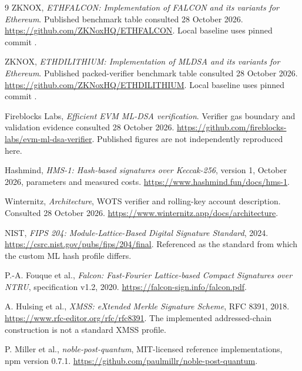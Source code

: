 \documentclass[11pt,a4paper]{article}
\begin{document}
\newpage
\renewcommand{\refname}{References and evidence sources}
\begin{thebibliography}{9}
\small
{} ZKNOX, \emph{ETHFALCON: Implementation of FALCON and
its variants for Ethereum}. Published benchmark table consulted 28 October
2026. \url{https://github.com/ZKNoxHQ/ETHFALCON}.
Local baseline uses pinned commit
.

 ZKNOX, \emph{ETHDILITHIUM: Implementation of MLDSA and
its variants for Ethereum}. Published packed-verifier benchmark table
consulted 28 October 2026. \url{https://github.com/ZKNoxHQ/ETHDILITHIUM}.
Local baseline uses pinned commit
.

 Fireblocks Labs, \emph{Efficient EVM ML-DSA verification}.
Verifier gas boundary and validation evidence consulted 28 October 2026.
\url{https://github.com/fireblocks-labs/evm-ml-dsa-verifier}.
Published figures are not independently reproduced here.

 Hashmind, \emph{HMS-1: Hash-based signatures over
Keccak-256}, version 1, October 2026, parameters and measured costs.
\url{https://www.hashmind.fun/docs/hms-1}.

 Winternitz, \emph{Architecture}, WOTS verifier and
rolling-key account description. Consulted 28 October 2026.
\url{https://www.winternitz.app/docs/architecture}.

 NIST, \emph{FIPS 204: Module-Lattice-Based Digital
Signature Standard}, 2024.
\url{https://csrc.nist.gov/pubs/fips/204/final}.
Referenced as the standard from which the custom ML hash profile differs.

 P.-A. Fouque et al., \emph{Falcon: Fast-Fourier
Lattice-based Compact Signatures over NTRU}, specification v1.2, 2020.
\url{https://falcon-sign.info/falcon.pdf}.

 A. Hulsing et al., \emph{XMSS: eXtended Merkle Signature
Scheme}, RFC 8391, 2018. \url{https://www.rfc-editor.org/rfc/rfc8391}.
The implemented addressed-chain construction is not a standard XMSS profile.

 P. Miller et al., \emph{noble-post-quantum}, MIT-licensed
reference implementations, npm version 0.7.1.
\url{https://github.com/paulmillr/noble-post-quantum}.
\end{thebibliography}
\end{document}
